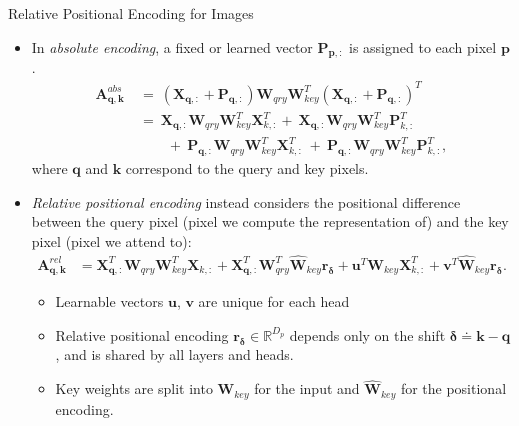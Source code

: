 \documentclass[9pt]{beamer}
\newcommand{\bb}{\mathbb}
\newcommand{\mb}{\bm}
\begin{document}
\newcommand{\WW}{ \mb W_{qry}\mb W_{key}^T }
\begin{frame}{Relative Positional Encoding for Images}
\begin{itemize}
\item In {\em absolute encoding}, a fixed or learned vector $\bm P_{\bm p,:}$ is assigned to each pixel $\bm p$. 
\begin{align}
\mb A^{abs}_{\mb q, \mb k} 
\ &=\ (\mb X_{\mb q,:} + \mb P_{\mb q,:})\WW(\mb X_{\mb q,:} + \mb P_{\mb q,:})^T \nonumber
\\ &=\ \mb X_{\mb q,:}\WW\mb X^T_{k,:} +\ \mb X_{\mb q,:}\WW\mb P^T_{k,:} 
\\ &\qquad +\ \mb P_{\mb q,:}\WW\mb X^T_{k,:} \ +\ \mb P_{\mb q,:}\WW\mb P^T_{k,:}, \nonumber
\end{align}
where $\bm q$ and $\bm k$ correspond to the query and key pixels.

\item \emph{Relative positional encoding} instead considers the positional difference between the query pixel (pixel we compute the representation of) and the key pixel (pixel we attend to):
\begin{align}
    \mb A^{rel}_{\mb q, \mb k} &= 
        \mb X_{\mb q,:}^T \WW \mb X_{k,:}
        + \mb X_{\mb q,:}^T \mb W_{qry}^T\hat{\mb W}_{key} \mb r_{\mb \delta}
        + \mb u^T \mb W_{key} \mb X^T_{k,:}
        + \mb v^T \hat{\mb W}_{key} \mb r_{\bm\delta}.
    \label{relposenc}
\end{align}
\vspace{-.15in}
\begin{itemize}
    \item Learnable vectors $\bm u$, $\bm v$ are unique for each head 
    \item Relative positional encoding $\bm r_{\bm \delta} \in \bb R^{D_p}$ depends only on the shift $\bm \delta \doteq \bm k -\bm q$, and is shared by all layers and heads.
    \item Key weights are split into $\bm W_{key}$ for the input and $\hat{\bm W}_{key}$ for the positional encoding.
\end{itemize}

\end{itemize}
\end{frame}
\end{document}

